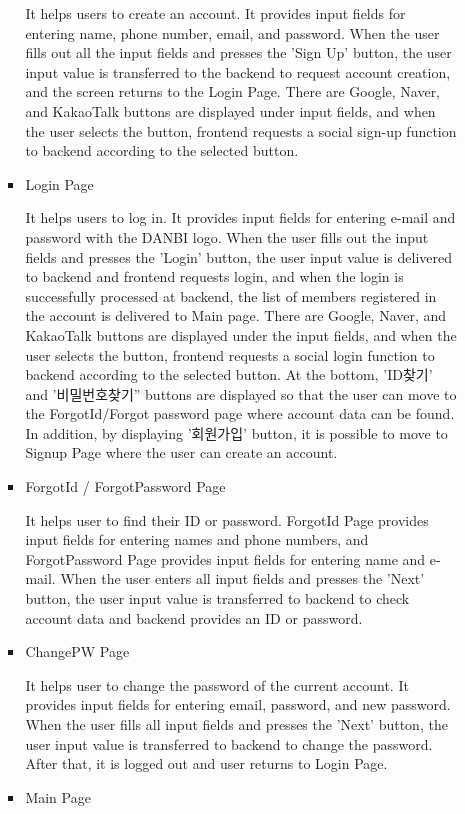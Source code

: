 \documentclass[conference]{IEEEtran}
\begin{document}
\begin{itemize}
\begin{enumerate}
\begin{itemize}
            It helps users to create an account. It provides input fields for entering name, phone number, email, and password. When the user fills out all the input fields and presses the 'Sign Up' button, the user input value is transferred to the backend to request account creation, and the screen returns to the Login Page. There are Google, Naver, and KakaoTalk buttons are displayed under input fields, and when the user selects the button, frontend requests a social sign-up function to backend according to the selected button.
            \item Login Page
            \setlength{\parindent}{2ex}
            
            It helps users to log in. It provides input fields for entering e-mail and password with the DANBI logo. When the user fills out the input fields and presses the 'Login' button, the user input value is delivered to backend and frontend requests login, and when the login is successfully processed at backend, the list of members registered in the account is delivered to Main page. There are Google, Naver, and KakaoTalk buttons are displayed under the input fields, and when the user selects the button, frontend requests a social login function to backend according to the selected button. At the bottom, 'ID찾기' and '비밀번호찾기'' buttons are displayed so that the user can move to the ForgotId/Forgot password page where account data can be found. In addition, by displaying '회원가입' button, it is possible to move to Signup Page where the user can create an account.
            \item ForgotId / ForgotPassword Page
            \setlength{\parindent}{2ex}
            
            It helps user to find their ID or password. ForgotId Page provides input fields for entering names and phone numbers, and ForgotPassword Page provides input fields for entering name and e-mail. When the user enters all input fields and presses the 'Next' button, the user input value is transferred to backend to check account data and backend provides an ID or password.
            \item ChangePW Page
            \setlength{\parindent}{2ex}
            
            It helps user to change the password of the current account. It provides input fields for entering email, password, and new password. When the user fills all input fields and presses the 'Next' button, the user input value is transferred to backend to change the password. After that, it is logged out and user returns to Login Page.
            \item Main Page
            \setlength{\parindent}{2ex}
            

\end{itemize}
\end{enumerate}
\end{itemize}
\end{document}
